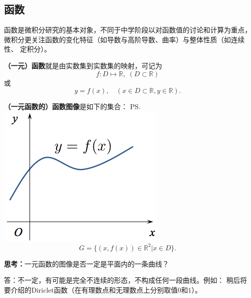 \subsection{函数}
	
函数是微积分研究的基本对象，不同于中学阶段以对函数值的讨论和计算为重点，
微积分更关注函数的变化特征（如导数与高阶导数、曲率）与整体性质（如连续性、
定积分）。

{\bf （一元）函数}就是由实数集到实数集的映射，可记为
$$f:D\mapsto\mathbb{R},\;(D\subset\mathbb{R})$$
或
$$y=f(x),\quad (x\in D\subset\mathbb{R},y\in\mathbb{R}).$$

{\bf （一元函数的）函数图像}是如下的集合：
\ps{\includegraphics[width=\marginparwidth]{./images/Ch01/C_fx.jpg}}
$$G=\{(x,f(x))\in\mathbb{R}^2|x\in D\}.$$

{\bf 思考：}一元函数的图像是否一定是平面内的一条曲线？

\ifhint
答：不一定，有可能是完全不连续的形态，不构成任何一段曲线。例如：
稍后将要介绍的Diriclet函数（在有理数点和无理数点上分别取值$0$和$1$）。
\fi

